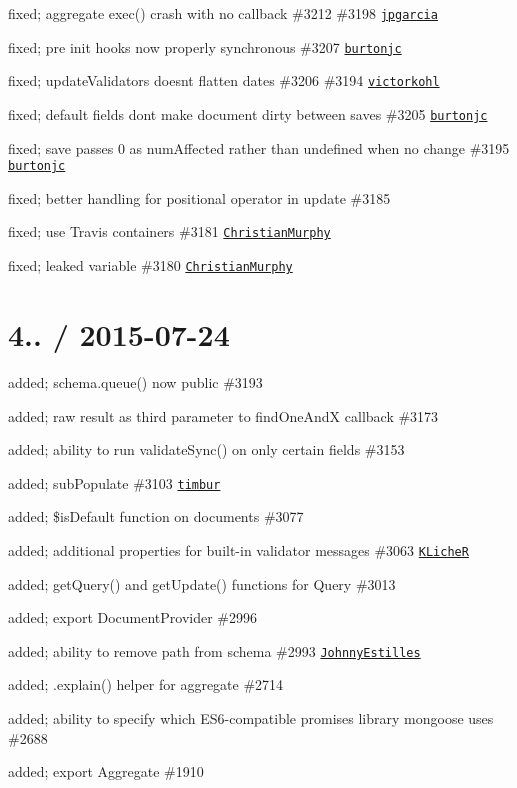 \begin{DoxyItemize}
\item fixed; aggregate exec() crash with no callback \#3212 \#3198 \href{https://github.com/jpgarcia}{\tt jpgarcia}
\item fixed; pre init hooks now properly synchronous \#3207 \href{https://github.com/burtonjc}{\tt burtonjc}
\item fixed; update\+Validators doesn\textquotesingle{}t flatten dates \#3206 \#3194 \href{https://github.com/victorkohl}{\tt victorkohl}
\item fixed; default fields don\textquotesingle{}t make document dirty between saves \#3205 \href{https://github.com/burtonjc}{\tt burtonjc}
\item fixed; save passes 0 as num\+Affected rather than undefined when no change \#3195 \href{https://github.com/burtonjc}{\tt burtonjc}
\item fixed; better handling for positional operator in update \#3185
\item fixed; use Travis containers \#3181 \href{https://github.com/ChristianMurphy}{\tt Christian\+Murphy}
\item fixed; leaked variable \#3180 \href{https://github.com/ChristianMurphy}{\tt Christian\+Murphy}
\end{DoxyItemize}

\section*{4.. / 2015-\/07-\/24 }


\begin{DoxyItemize}
\item added; {\ttfamily schema.\+queue()} now public \#3193
\item added; raw result as third parameter to find\+One\+AndX callback \#3173
\item added; ability to run validate\+Sync() on only certain fields \#3153
\item added; sub\+Populate \#3103 \href{https://github.com/timbur}{\tt timbur}
\item added; \$is\+Default function on documents \#3077
\item added; additional properties for built-\/in validator messages \#3063 \href{https://github.com/KLicheR}{\tt K\+LicheR}
\item added; get\+Query() and get\+Update() functions for Query \#3013
\item added; export Document\+Provider \#2996
\item added; ability to remove path from schema \#2993 \href{https://github.com/JohnnyEstilles}{\tt Johnny\+Estilles}
\item added; .explain() helper for aggregate \#2714
\item added; ability to specify which E\+S6-\/compatible promises library mongoose uses \#2688
\item added; export Aggregate \#1910
\end{DoxyItemize}

